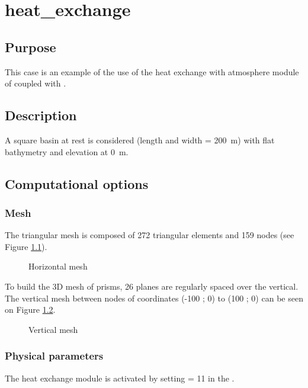 \chapter{heat\_exchange}
%
%
\section{Purpose}
%
This case is an example of the use of the heat exchange with atmosphere module
of \waqtel coupled with .
%
\section{Description}
%
A square basin at rest is considered (length and width = 200~m)
with flat bathymetry and elevation at 0~m.
%
\section{Computational options}
%
\subsection{Mesh}
%
The triangular mesh is composed of 272 triangular elements and 159 nodes
(see Figure \ref{fig:heat_exchange:mesh}).

\begin{figure}[H]
 \centering
\caption{Horizontal mesh}
 \label{fig:heat_exchange:mesh}
\end{figure}

To build the 3D mesh of prisms, 26 planes are regularly spaced over the vertical.
The vertical mesh between nodes of coordinates (-100 ; 0) to (100 ; 0) can be
seen on Figure \ref{fig:heat_exchange:mesh_section}.

\begin{figure}[H]
 \centering
\caption{Vertical mesh}
 \label{fig:heat_exchange:mesh_section}
\end{figure}
%
\subsection{Physical parameters}
%
The heat exchange module is activated by setting 
= 11 in the  .\\

